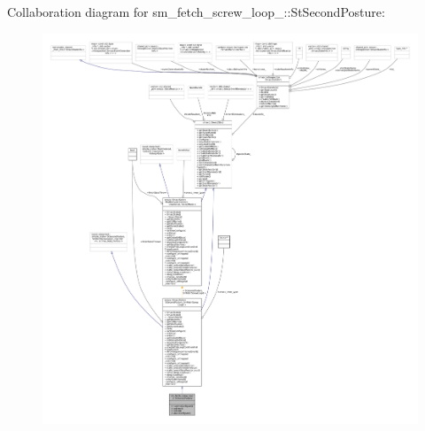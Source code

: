 Collaboration diagram for sm\+\_\+fetch\+\_\+screw\+\_\+loop\+\_\+:\+:St\+Second\+Posture\+:
\nopagebreak
\begin{figure}[H]
\begin{center}
\leavevmode
\includegraphics[width=350pt]{structsm__fetch__screw__loop__1_1_1StSecondPosture__coll__graph}
\end{center}
\end{figure}
